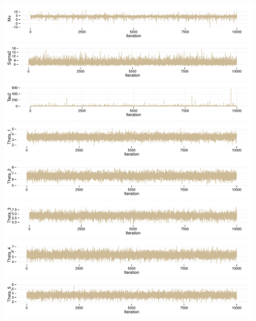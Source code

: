 \documentclass[]{article}
\begin{document}
\includegraphics{markdown_hw3_files/figure-latex/unnamed-chunk-7-1.pdf}
\includegraphics{markdown_hw3_files/figure-latex/unnamed-chunk-8-1.pdf}
\includegraphics{markdown_hw3_files/figure-latex/unnamed-chunk-8-2.pdf}
\includegraphics{markdown_hw3_files/figure-latex/unnamed-chunk-8-3.pdf}
\includegraphics{markdown_hw3_files/figure-latex/unnamed-chunk-8-4.pdf}
\includegraphics{markdown_hw3_files/figure-latex/unnamed-chunk-8-5.pdf}
\includegraphics{markdown_hw3_files/figure-latex/unnamed-chunk-8-6.pdf}
\includegraphics{markdown_hw3_files/figure-latex/unnamed-chunk-8-7.pdf}
\end{document}
